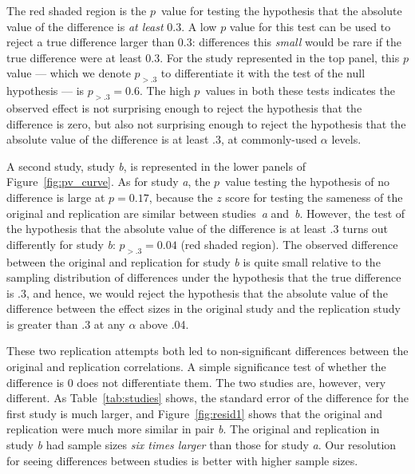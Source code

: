 \documentclass[doc,a4paper,floatsintext,draftfirst]{apa6}
\begin{document}
The red shaded region is the $p$~value for testing the hypothesis that the absolute value of the difference is {\em at least} 0.3. A low $p$ value for this test can be used to reject a true difference larger than 0.3: differences this {\em small} would be rare if the true difference were at least 0.3. For the study represented in the top panel, this $p$ value --- which we denote $p_{>.3}$ to differentiate it with the test of the null hypothesis --- is $p_{>.3}=0.6$. The high $p$~values in both these tests indicates the observed effect is not surprising enough to reject the hypothesis that the difference is zero, but also not surprising enough to reject the hypothesis that the absolute value of the difference is at least .3, at commonly-used $\alpha$ levels. 

A second study, study {\em b}, is represented in the lower panels of Figure~\ref{fig:pv_curve}. As for study {\em a}, the $p$~value testing the hypothesis of no difference is large at $p=0.17$, because the $z$ score for testing the sameness of the original and replication are similar between studies~{\em a} and~{\em b}. However, the test of the hypothesis that the absolute value of the difference is at least .3 turns out differently for study {\em b}: $p_{>.3}=0.04$ (red shaded region). The observed difference between the original and replication for study {\em b} is quite small relative to the sampling distribution of differences under the hypothesis that the true difference is .3, and hence, we would reject the hypothesis that the absolute value of the difference between the effect sizes in the original study and the replication study is greater than .3 at any $\alpha$ above .04.

These two replication attempts both led to non-significant differences between the original and replication correlations. A simple significance test of whether the difference is 0 does not differentiate them. The two studies are, however, very different. As Table~\ref{tab:studies} shows, the standard error of the difference for the first study is much larger, and Figure~\ref{fig:resid1} shows that the original and replication were much more similar in pair {\em b}. The original and replication in study {\em b} had sample sizes {\em six times larger} than those for study {\em a}. Our resolution for seeing differences between studies is better with higher sample sizes.
\end{document}
